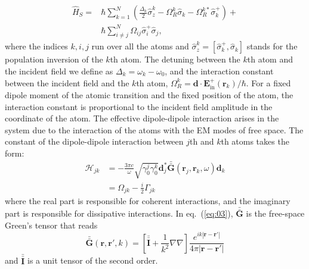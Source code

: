 \documentclass[aps,prl,twocolumn,superscriptaddress,showpacs,amsmath,amssymb]{revtex4-2}
\begin{document}
\begin{align} \label{eq:02}
    \hat{H}_S =& \hbar \sum_{k=1}^N \left( \frac{\Delta_k}{2} \hat{\sigma}_z^k - \Omega_R^k \hat{\sigma}_k - \Omega_R^{k*} \hat{\sigma}_k^+ \right) + \nonumber \\
               & \hbar \sum_{i \neq j}^N \Omega_{ij} \hat{\sigma}_i^+ \hat{\sigma}_j,
\end{align}
where the indices $k,i,j$ run over all the atoms and $\hat{\sigma}_z^k = \left[ \hat{\sigma}_k^+, \hat{\sigma}_k \right]$ stands for the population inversion of the $k$th atom. 
The detuning between the $k$th atom and the incident field we define as $\Delta_k = \omega_k - \omega_0$, and the interaction constant between the incident field and the $k$th atom, $\Omega_R^k = \mathbf{d} \cdot \mathbf{E}_\mathrm{in}^+ (\mathbf{r}_k) / \hbar$. 
For a fixed dipole moment of the atomic transition and the fixed position of the atom, the interaction constant is proportional to the incident field amplitude in the coordinate of the atom. 
The effective dipole-dipole interaction arises in the system due to the interaction of the atoms with the EM modes of free space. 
The constant of the dipole-dipole interaction between $j$th and $k$th atoms takes the form:
\begin{align} \label{eq:03}
    \mathcal{H}_{jk} &= - \frac{3 \pi c}{\omega} \sqrt{\gamma_0^j \gamma_0^k} \mathbf{d}_j^* \bar{\bar{\mathbf{G}}}(\mathbf{r}_j, \mathbf{r}_k, \omega) \mathbf{d}_k  \\
                     & = \Omega_{jk} - \frac{i}{2} \Gamma_{jk} \nonumber
\end{align}
where the real part is responsible for coherent interactions, and the imaginary part is responsible for dissipative interactions.
In eq.~(\ref{eq:03}), $\bar{\bar{\mathbf{G}}}$ is the free-space Green's tensor that reads
\begin{equation}
    \bar{\bar{\mathbf{G}}}(\mathbf{r}, \mathbf{r}', k) = \left[ \bar{\bar{\mathbf{I}}} + \frac{1}{k^2} \nabla \nabla \right] \frac{e^{i k |\mathbf{r} - \mathbf{r}'|}}{4 \pi |\mathbf{r} - \mathbf{r}'|}
    \label{eq:04}
\end{equation}
and $\bar{\bar{\mathbf{I}}}$ is a unit tensor of the second order.
\end{document}
